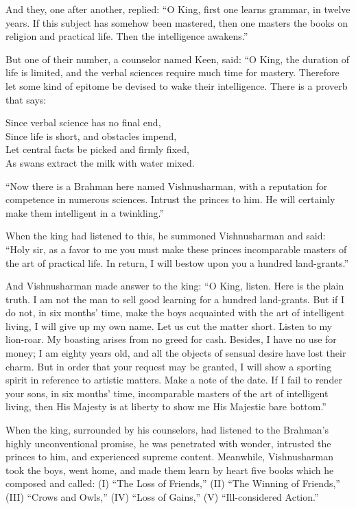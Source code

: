 And they, one after another, replied: ``O King, first one learns
grammar, in twelve years. If this subject has somehow been mastered,
then one masters the books on religion and practical life. Then the
intelligence awakens.''

But one of their number, a counselor named Keen,
said: ``O King, the duration of life is limited, and the
verbal sciences require much time for mastery.
Therefore let some kind of epitome be devised to
wake their intelligence. There is a proverb that says:

\begin{pverse}
  Since verbal science has no final end,\\
  Since life is short, and obstacles impend,\\
  Let central facts be picked and firmly fixed,\\
  As swans extract the milk with water mixed.
\end{pverse}

``Now there is a Brahman here named Vishnusharman, with a reputation
for competence in numerous sciences. Intrust the princes to him. He
will certainly make them intelligent in a twinkling.''

When the king had listened to this, he summoned Vishnusharman and
said: ``Holy sir, as a favor to me you must make these princes
incomparable masters of the art of practical life. In return, I will
bestow upon you a hundred land-grants.''

And Vishnusharman made answer to the king: ``O King, listen. Here is
the plain truth. I am not the man to sell good learning for a hundred
land-grants.  But if I do not, in six months' time, make the boys
acquainted with the art of intelligent living, I will give up my own
name. Let us cut the matter short.  Listen to my lion-roar. My
boasting arises from no greed for cash. Besides, I have no use for
money; I am eighty years old, and all the objects of sensual desire
have lost their charm. But in order that your request may be granted,
I will show a sporting spirit in reference to artistic matters. Make a
note of the date. If I fail to render your sons, in six months' time,
incomparable masters of the art of intelligent living, then His
Majesty is at liberty to show me His Majestic bare bottom.''

When the king, surrounded by his counselors, had listened to the
Brahman's highly unconventional promise, he was penetrated with
wonder, intrusted the princes to him, and experienced supreme content.
Meanwhile, Vishnusharman took the boys, went home, and made them learn
by heart five books which he composed and called: (I) ``The Loss of
Friends,'' (II) ``The Winning of Friends,'' (III) ``Crows and Owls,'' (IV)
``Loss of Gains,'' (V) ``Ill-considered Action.''

